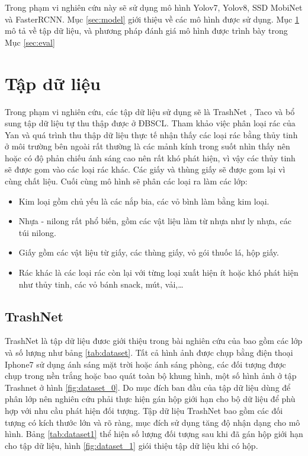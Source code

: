 \documentclass[../the.tex]{subfiles}
\begin{document}
Trong phạm vi nghiên cứu này sẽ sử dụng mô hình Yolov7, Yolov8, SSD MobiNet và FasterRCNN. Mục \ref{sec:model} giới thiệu về các mô hình được sử dụng. Mục \ref{sec:dataset} mô tả về tập dữ liệu, và phương pháp đánh giá mô hình được trình bày trong Mục \ref{sec:eval}

\section{Tập dữ liệu}
\label{sec:dataset}

{\fontsize{13}{12} \selectfont
	Trong phạm vi nghiên cứu, các tập dữ liệu sử dụng sẽ là TrashNet \cite{yang2016classification}, Taco \cite{proença2020taco} và bổ sung tập dữ liệu tự thu thập được ở ĐBSCL.
	Tham khảo việc phân loại rác của Yan \cite{yang2016classification} và quá trình thu thập dữ liệu thực tế nhận thấy các loại rác bằng thủy tinh ở môi trường bên ngoài rất thường là các mảnh kính trong suốt nhìn thấy nên hoặc có độ phản chiếu ánh sáng cao nên rất khó phát hiện, vì vậy các thủy tinh sẽ được gom vào các loại rác khác.
	Các giấy và thùng giấy sẽ được gom lại vì cùng chất liệu. Cuối cùng mô hình sẽ phân các loại ra làm các lớp:
	\begin{itemize}
		\item Kim loại gồm chủ yếu là các nắp bia, các vỏ bình làm bằng kim loại.
		\item Nhựa - nilong rất phổ biến, gồm các vật liệu làm từ nhựa như ly nhựa, các túi nilong.
		\item Giấy gồm các vật liệu từ giấy, các thùng giấy, vỏ gói thuốc lá, hộp giấy.
		\item Rác khác là các loại rác còn lại với từng loại xuất hiện ít hoặc khó phát hiện như thủy tinh, các vỏ bánh snack,
		      mút, vải,\dots
	\end{itemize}

	\subsection{TrashNet}
	{\fontsize{13}{12} \selectfont
		TrashNet là tập dữ liệu đươc giới thiệu trong bài nghiên cứu của \cite{yang2016classification} bao gồm các lớp và số lượng như bảng \ref{tab:dataset}. Tất cả hình ảnh được chụp bằng điện thoại Iphone7 sử dụng ánh sáng mặt trời hoặc ánh sáng phòng, các đối tượng được chụp trong nền trắng hoặc bao quát toàn bộ khung hình, một số hình ảnh ở tập Trashnet ở hình
		\ref{fig:dataset_0}.
		Do mục đích ban đầu của tập dữ liệu dùng để phân lớp nên nghiên cứu phải thực hiện gán hộp giới hạn cho bộ dữ liệu để phù hợp với nhu cầu phát hiện đối tượng. Tập dữ liệu TrashNet bao gồm các đối tượng có kích thước lớn và rõ ràng, mục đích sử dụng tăng độ nhận dạng cho mô hình. Bảng \ref{tab:dataset1} thể hiện số lượng đối tượng sau khi đã gán hộp giới hạn cho tập dữ liệu, hình
		\ref{fig:dataset_1} giói thiệu tập dữ liệu khi có hộp.
	}
}
\end{document}
